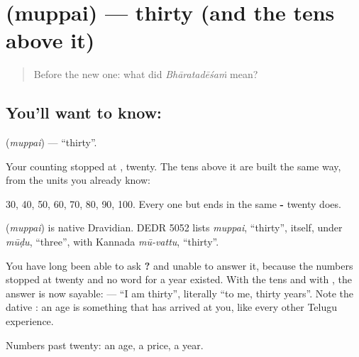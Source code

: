 \section[\texorpdfstring{\te{ముప్పై} (muppai)}{ముప్పై (muppai)}]{ (muppai) — thirty (and the tens above it)}

\label{lesson:TE-C77-thirty}



\begin{quote}
Before the new one: what did \emph{Bhāratadēśaṁ} mean?
\end{quote}

\subsection*{You'll want to know: }
\textbf{} (\emph{muppai}) — \textquotedblleft{}thirty\textquotedblright{}.

Your counting stopped at , twenty. The tens above it are built the same way, from the units you already know:

 30, \textbf{} 40, \textbf{} 50, \textbf{} 60, \textbf{} 70, \textbf{} 80, \textbf{} 90, \textbf{} 100. Every one but  ends in the same \textbf{-} twenty does.

\begin{cousinweb}
\textbf{} (\emph{muppai}) is native Dravidian. DEDR 5052 lists \emph{muppai}, \textquotedblleft{}thirty\textquotedblright{}, itself, under \emph{mūḍu}, \textquotedblleft{}three\textquotedblright{}, with Kannada \emph{mū-vattu}, \textquotedblleft{}thirty\textquotedblright{}.
\end{cousinweb}

\begin{grammarlens}[title={Grammar Lens: an age, at last}]
You have long been able to ask \textbf{ ?} and unable to answer it, because the numbers stopped at twenty and no word for a year existed. With the tens and with , the answer is now sayable: \textbf{  } — \textquotedblleft{}I am thirty\textquotedblright{}, literally \textquotedblleft{}to me, thirty years\textquotedblright{}. Note the dative : an age is something that has arrived at you, like every other Telugu experience.
\end{grammarlens}

\begin{grammarlens}[title={What you've built}]
Numbers past twenty: an age, a price, a year.
\end{grammarlens}

